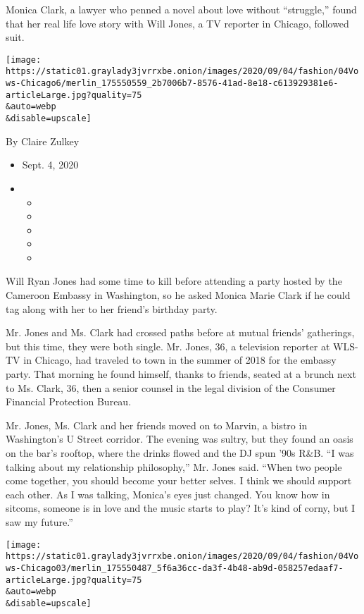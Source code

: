 Monica Clark, a lawyer who penned a novel about love without
``struggle,'' found that her real life love story with Will Jones, a TV
reporter in Chicago, followed suit.

\texttt{[image: https://static01.graylady3jvrrxbe.onion/images/2020/09/04/fashion/04Vows-Chicago6/merlin\_175550559\_2b7006b7-8576-41ad-8e18-c613929381e6-articleLarge.jpg?quality=75\\\&auto=webp\\\&disable=upscale]}

By Claire Zulkey

\begin{itemize}
\item
  Sept. 4, 2020
\item
  \begin{itemize}
  \item
  \item
  \item
  \item
  \item
  \end{itemize}
\end{itemize}

Will Ryan Jones had some time to kill before attending a party hosted by
the Cameroon Embassy in Washington, so he asked Monica Marie Clark if he
could tag along with her to her friend's birthday party.

Mr. Jones and Ms. Clark had crossed paths before at mutual friends'
gatherings, but this time, they were both single. Mr. Jones, 36, a
television reporter at WLS-TV in Chicago, had traveled to town in the
summer of 2018 for the embassy party. That morning he found himself,
thanks to friends, seated at a brunch next to Ms. Clark, 36, then a
senior counsel in the legal division of the Consumer Financial
Protection Bureau.

Mr. Jones, Ms. Clark and her friends moved on to Marvin, a bistro in
Washington's U Street corridor. The evening was sultry, but they found
an oasis on the bar's rooftop, where the drinks flowed and the DJ spun
'90s R\&B. ``I was talking about my relationship philosophy,'' Mr. Jones
said. ``When two people come together, you should become your better
selves. I think we should support each other. As I was talking, Monica's
eyes just changed. You know how in sitcoms, someone is in love and the
music starts to play? It's kind of corny, but I saw my future.''

\texttt{[image: https://static01.graylady3jvrrxbe.onion/images/2020/09/04/fashion/04Vows-Chicago03/merlin\_175550487\_5f6a36cc-da3f-4b48-ab9d-058257edaaf7-articleLarge.jpg?quality=75\\\&auto=webp\\\&disable=upscale]}


